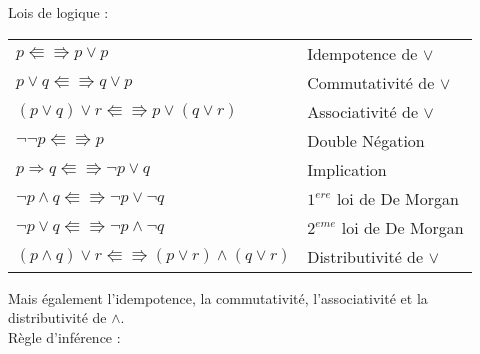 		Lois de logique : 	
			\begin{center}
			\begin{tabular}{ll}
			$p \Lleftarrow \Rrightarrow p \lor p$ & Idempotence de $\lor$\\
			$p \lor q \Lleftarrow \Rrightarrow q \lor p$ & Commutativité de $\lor$\\
			$(p \lor q) \lor r \Lleftarrow \Rrightarrow p \lor (q \lor r)$ & Associativité de $\lor$\\
			$ \lnot \lnot p \Lleftarrow \Rrightarrow p$ & Double Négation\\
			$p \Rightarrow q \Lleftarrow \Rrightarrow \lnot p \lor q$ & Implication\\
			$\lnot p \land q \Lleftarrow \Rrightarrow \lnot p \lor \lnot q$ & $1^{ere}$ loi de De Morgan\\
			$\lnot p \lor q \Lleftarrow \Rrightarrow \lnot p \land \lnot q$ & $2^{eme}$ loi de De Morgan\\
			$(p \land q) \lor r \Lleftarrow \Rrightarrow (p \lor r) \land (q \lor r)$ & Distributivité de $\lor$\\
			\end{tabular}
			\end{center}
			Mais également l'idempotence, la commutativité, l'associativité et la distributivité de $\land$.\\
			
		Règle d'inférence : \\
		
